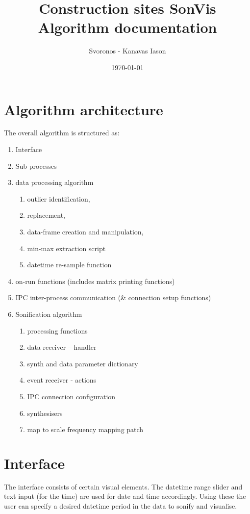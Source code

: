 \documentclass[11pt]{article}
\author{Svoronos - Kanavas Iason}
\date{\today}
\title{Construction sites SonVis Algorithm documentation}
\begin{document}
\maketitle
\tableofcontents


\section{Algorithm architecture}
\label{sec:orgf99a35b}
The overall algorithm is structured as:
\begin{enumerate}
\item Interface
\item Sub-processes
\item data processing algorithm
\begin{enumerate}
\item outlier identification,
\item replacement,
\item data-frame creation and manipulation,
\item min-max extraction script
\item datetime re-sample function
\end{enumerate}
\item on-run functions (includes matrix printing functions)
\item IPC inter-process communication (\& connection setup functions)
\item Sonification algorithm
\begin{enumerate}
\item processing functions
\item data receiver -- handler
\item synth and data parameter dictionary
\item event receiver - actions
\item IPC connection configuration
\item synthesisers
\item map to scale frequency mapping patch
\end{enumerate}
\end{enumerate}

\section{Interface}
\label{sec:org0f781a3}
The interface consists of certain visual elements.
The datetime range slider and text input (for the time) are used for date and time accordingly. Using these the user can specify a desired datetime period in the data to sonify and visualise.
\end{document}
